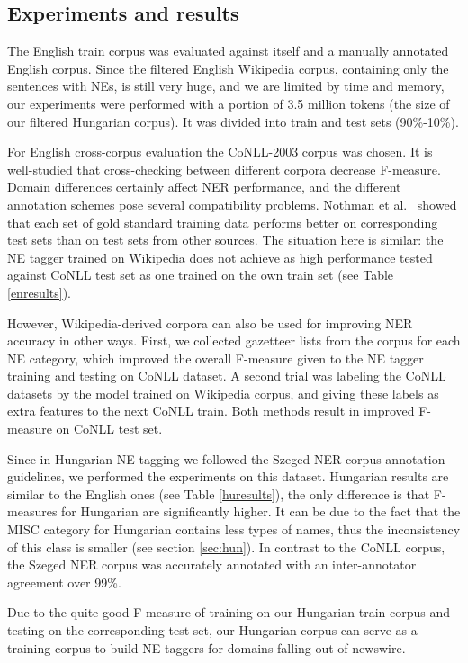 \documentclass[11pt]{article}
\begin{document}
\subsection{Experiments and results}

The English train corpus was evaluated against itself and a manually annotated English corpus. Since the filtered English Wikipedia corpus, containing only the sentences with NEs, is still very huge, and we are limited by time and memory, our experiments were performed with a portion of 3.5 million tokens (the size of our filtered Hungarian corpus). It was divided into train and test sets (90\%-10\%). 

For English cross-corpus evaluation the CoNLL-2003 corpus was chosen. It is well-studied that cross-checking between different corpora decrease F-measure. Domain differences certainly affect NER performance, and the different annotation schemes pose several compatibility problems. Nothman et al.~ showed that each set of gold standard training data performs better on corresponding test sets than on test sets from other sources. The situation here is similar: the NE tagger trained on Wikipedia does not achieve as high performance tested against CoNLL test set as one trained on the own train set (see Table \ref{enresults}). 

However, Wikipedia-derived corpora can also be used for improving NER accuracy in other ways. First, we collected gazetteer lists from the corpus for each NE category, which improved the overall F-measure given to the NE tagger training and testing on CoNLL dataset. A second trial was labeling the CoNLL datasets by the model trained on Wikipedia corpus, and giving these labels as extra features to the next CoNLL train. Both methods result in improved F-measure on CoNLL test set.  

Since in Hungarian NE tagging we followed the Szeged NER corpus annotation guidelines, we performed the experiments on this dataset. Hungarian results are similar to the English ones (see Table \ref{huresults}), the only difference is that F-measures for Hungarian are significantly higher. It can be due to the fact that the MISC category for Hungarian contains less types of names, thus the inconsistency of this class is smaller (see section \ref{sec:hun}). In contrast to the CoNLL corpus, the Szeged NER corpus was accurately annotated with an inter-annotator agreement over 99\%.  

Due to the quite good F-measure of training on our Hungarian train corpus and testing on the corresponding test set, our Hungarian corpus can serve as a training corpus to build NE taggers for domains falling out of newswire. 
\end{document}

